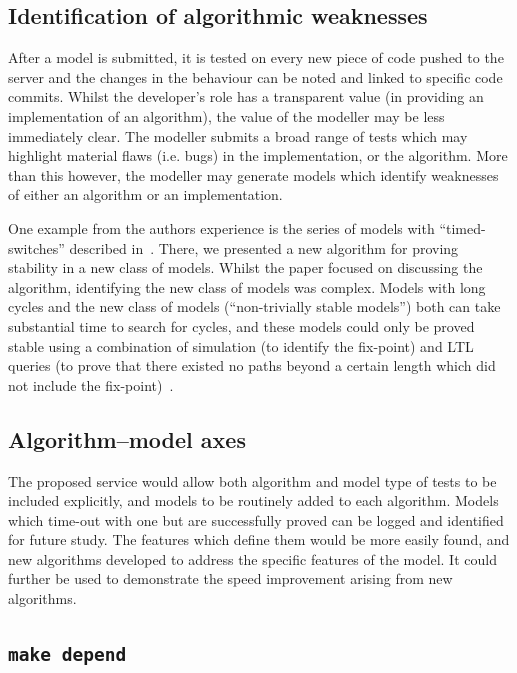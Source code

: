 \documentclass[conference]{IEEEtran}
\begin{document}
\subsection{Identification of algorithmic weaknesses}

After a model is submitted, it is tested on every new piece of code
pushed to the server and the changes in the behaviour can be noted and
linked to specific code commits. Whilst the developer's role has a
transparent value (in providing an implementation of an algorithm),
the value of the modeller may be less immediately clear. The modeller
submits a broad range of tests which may highlight material flaws
(i.e. bugs) in the implementation, or the algorithm. More than this
however, the modeller may generate models which identify weaknesses of
either an algorithm or an implementation.

One example from the authors experience is the series of models with
``timed-switches'' described in~\cite{cook-et-al:2014}. There, we
presented a new algorithm for proving stability in a new class of
models. Whilst the paper focused on discussing the algorithm,
identifying the new class of models was complex. Models with long
cycles and the new class of models (``non-trivially stable models'')
both can take substantial time to search for cycles, and these models
could only be proved stable using a combination of simulation (to
identify the fix-point) and LTL queries (to prove that there existed
no paths beyond a certain length which did not include the
fix-point)~\cite{claessen-et-al:2013}.

\subsection{Algorithm--model axes}

The proposed service would allow both algorithm and model type of tests to be included
explicitly, and models to be routinely added to each algorithm. Models
which time-out with one but are successfully proved can be logged and
identified for future study.  The features which define them would be
more easily found, and new algorithms developed to address the
specific features of the model. It could further be used to
demonstrate the speed improvement arising from new algorithms.

\subsection{{\texttt{make depend}}}
\end{document}
